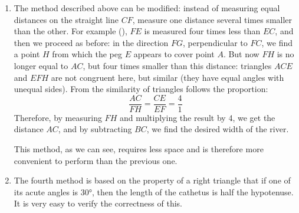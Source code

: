 \begin{enumerate}
\item The method described above can be modified: instead of measuring equal distances on the straight line $CF$, measure one distance several times smaller than the other. For example (), $FE$ is measured four times less than $EC$, and then we proceed as before: in the direction $FG$, perpendicular to $FC$, we find a point $H$ from which the peg $E$ appears to cover point $A$. But now $FH$ is no longer equal to $AC$, but four times smaller than this distance: triangles $ACE$ and $EFH$ are not congruent here, but similar (they have equal angles with unequal sides). From the similarity of triangles follows the proportion:
\begin{equation*}%
\frac{AC}{FH} = \frac{CE}{EF} = \frac{4}{1}
\end{equation*}
Therefore, by measuring $FH$ and multiplying the result by 4, we get the distance $AC$, and by subtracting $BC$, we find the desired width of the river.

This method, as we can see, requires less space and is therefore more convenient to perform than the previous one.




\item The fourth method is based on the property of a right triangle that if one of its acute angles is \ang{30}, then the length of the cathetus is half the hypotenuse. It is very easy to verify the correctness of this. 


\end{enumerate}
